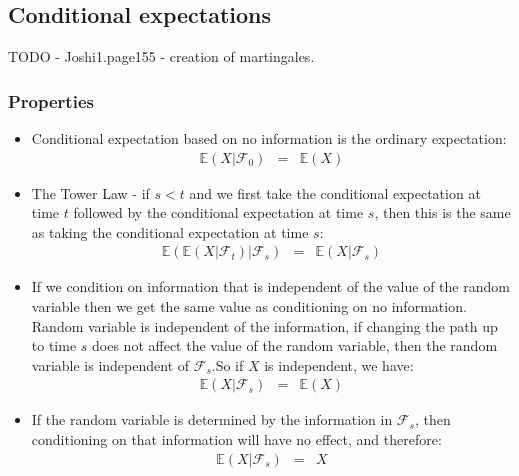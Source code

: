 \subsection{Conditional expectations}

TODO - Joshi1.page155 - creation of martingales.

\subsubsection{Properties}
\begin{itemize}
	\item Conditional expectation based on no information is the ordinary expectation:
	\begin{eqnarray}
	\mathbb{E}(X\vert \mathscr{F}_{0}) &=& \mathbb{E}(X)
	\end{eqnarray}
	\item The Tower Law - if $s < t$ and we first take the conditional expectation at time $t$ followed by the conditional expectation at time $s$, then this is the same as taking the conditional expectation at time $s$:
	\begin{eqnarray}
		\mathbb{E}(\mathbb{E}(X\vert \mathscr{F}_{t})\vert \mathscr{F}_{s}) &=& \mathbb{E}(X \vert \mathscr{F}_{s})
	\end{eqnarray}
	\item If we condition on information that is independent of the value of the random variable then we get the same value as conditioning on no information. Random variable is independent of the information, if changing the path up to time $s$ does not affect the value of the random variable, then the random variable is independent of $\mathscr{F}_{s}$.So if $X$ is independent, we have:
	\begin{eqnarray}
		\mathbb{E}(X\vert \mathscr{F}_{s}) &=& \mathbb{E}(X)
	\end{eqnarray}
	\item If the random variable is determined by the information in $\mathscr{F}_{s}$, then conditioning on that information will have no effect, and therefore:
	\begin{eqnarray}
	\mathbb{E}(X\vert\mathscr{F}_{s}) &=& X
	\end{eqnarray}
\end{itemize}

